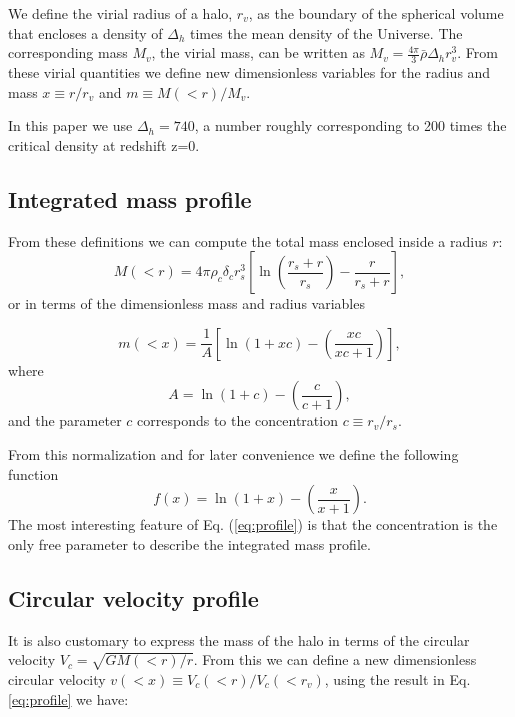 \documentclass{emulateapj}
\begin{document}
We define the virial radius of a halo, $r_v$, as the boundary of the
spherical volume that encloses a density of $\Delta_h$ times the mean
density of the Universe.  The corresponding mass $M_{v}$, the virial
mass, can be written as $M_{v} = \frac{4\pi}{3}\bar{\rho}\Delta_h
r_v^3$.  From these virial quantities we define new dimensionless
variables for the radius and mass $x\equiv r/r_v$ and $m\equiv
M(<r)/M_v$.

In this paper we use $\Delta_h=740$, a number roughly corresponding to
200 times the critical density at redshift z=0.


\subsection{Integrated mass profile}

From these definitions we can compute the total mass enclosed inside a
radius $r$:
\begin{equation}
M(<r) = 4\pi\rho_c\delta_c  r_s^3\left[\ln \left
  (\frac{r_s+r}{r_s}\right) - \frac{r}{r_s+r}\right],
\end{equation}
%
or in terms of the dimensionless mass and radius variables

\begin{equation}
m(<x) =
\frac{1}{A}\left[\ln\left(1+xc\right)-\left(\frac{xc}{xc+1}\right)\right],
\label{eq:profile}
\end{equation}
%
where
%
\begin{equation}
A=\ln\left(1+c\right)-\left(\frac{c}{c+1}\right),
\end{equation}
%
and the parameter $c$ corresponds to the concentration $c\equiv
r_v/r_s$.

From this normalization and for later convenience we define the
following function
%
\begin{equation}
f(x) = \ln\left(1+x\right)-\left(\frac{x}{x+1}\right).
\label{eq:f_NFW}
\end{equation}
%
The most interesting feature of Eq. (\ref{eq:profile}) is that the
concentration is the only free parameter to describe the integrated
mass profile.
 
\subsection{Circular velocity profile}

It is also customary to express the mass of the halo in terms of the
circular velocity $V_{c}=\sqrt{GM(<r)/r}$.  From this we can define a
new dimensionless circular velocity $v(<x)\equiv
V_{c}(<r)/V_{c}(<r_v)$, using the result in Eq. \ref{eq:profile} we
have:
\end{document}

